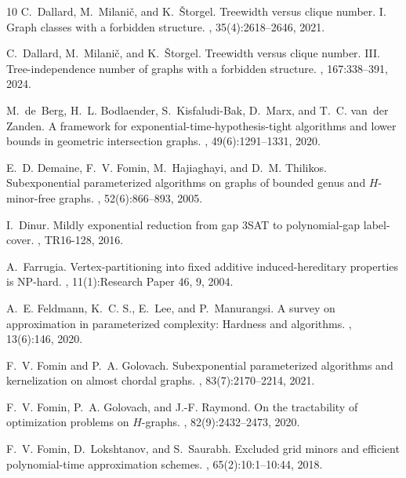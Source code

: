 \documentclass[11pt]{article}
\theoremstyle{definition}
\begin{document}
\begin{thebibliography}{10}
C.~Dallard, M.~Milani\v{c}, and K.~\v{S}torgel.
\newblock Treewidth versus clique number. {I}. {G}raph classes with a forbidden
  structure.
, 35(4):2618--2646, 2021.

C.~Dallard, M.~Milanič, and K.~Štorgel.
\newblock Treewidth versus clique number. {III}. {T}ree-independence number of
  graphs with a forbidden structure.
, 167:338--391, 2024.

M.~de~Berg, H.~L. Bodlaender, S.~Kisfaludi{-}Bak, D.~Marx, and T.~C. van~der
  Zanden.
\newblock A framework for exponential-time-hypothesis-tight algorithms and
  lower bounds in geometric intersection graphs.
, 49(6):1291--1331, 2020.

E.~D. Demaine, F.~V. Fomin, M.~Hajiaghayi, and D.~M. Thilikos.
\newblock Subexponential parameterized algorithms on graphs of bounded genus
  and {$H$}-minor-free graphs.
, 52(6):866--893, 2005.

I.~Dinur.
\newblock Mildly exponential reduction from gap {3SAT} to polynomial-gap
  label-cover.
, {TR16-128}, 2016.

A.~Farrugia.
\newblock Vertex-partitioning into fixed additive induced-hereditary properties
  is {NP}-hard.
, 11(1):Research Paper 46, 9, 2004.

A.~E. Feldmann, K.~{C. S.}, E.~Lee, and P.~Manurangsi.
\newblock A survey on approximation in parameterized complexity: Hardness and
  algorithms.
, 13(6):146, 2020.

F.~V. Fomin and P.~A. Golovach.
\newblock Subexponential parameterized algorithms and kernelization on almost
  chordal graphs.
, 83(7):2170--2214, 2021.

F.~V. Fomin, P.~A. Golovach, and J.-F. Raymond.
\newblock On the tractability of optimization problems on {$H$}-graphs.
, 82(9):2432--2473, 2020.

F.~V. Fomin, D.~Lokshtanov, and S.~Saurabh.
\newblock Excluded grid minors and efficient polynomial-time approximation
  schemes.
, 65(2):10:1--10:44, 2018.


\end{thebibliography}
\end{document}

